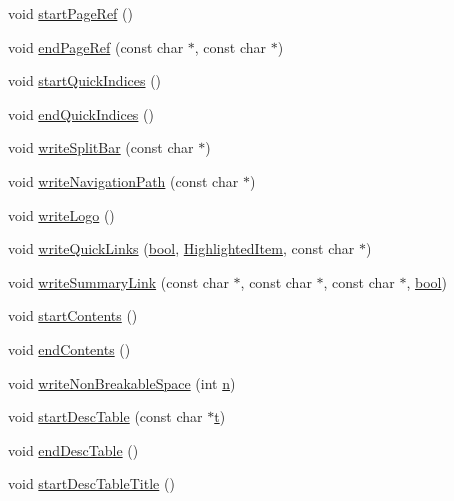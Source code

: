 \begin{DoxyCompactItemize}
\item 
void \hyperlink{class_man_generator_a15352d2d3122b7b9d24e9ea564026d9f}{start\+Page\+Ref} ()
\item 
void \hyperlink{class_man_generator_aedfd0c9012aa4bab7db46b5388552342}{end\+Page\+Ref} (const char $\ast$, const char $\ast$)
\item 
void \hyperlink{class_man_generator_a955d39d6b1272951e9c3696e55a7e97f}{start\+Quick\+Indices} ()
\item 
void \hyperlink{class_man_generator_a61560f36bab8608c98e9cf89fd5371bb}{end\+Quick\+Indices} ()
\item 
void \hyperlink{class_man_generator_a07aea6047475012679e979aca5d23038}{write\+Split\+Bar} (const char $\ast$)
\item 
void \hyperlink{class_man_generator_a51eac301eeb71972b89a4ac6be9fd6b5}{write\+Navigation\+Path} (const char $\ast$)
\item 
void \hyperlink{class_man_generator_abc49b9aa742057e1cbbea917451de6d7}{write\+Logo} ()
\item 
void \hyperlink{class_man_generator_aa821cd7a40d325d026c59dbd78221b98}{write\+Quick\+Links} (\hyperlink{qglobal_8h_a1062901a7428fdd9c7f180f5e01ea056}{bool}, \hyperlink{index_8h_a6643b7765422a7eb577f0b2ed8fb2e09}{Highlighted\+Item}, const char $\ast$)
\item 
void \hyperlink{class_man_generator_a984f33b43c990060e1472c97ed167304}{write\+Summary\+Link} (const char $\ast$, const char $\ast$, const char $\ast$, \hyperlink{qglobal_8h_a1062901a7428fdd9c7f180f5e01ea056}{bool})
\item 
void \hyperlink{class_man_generator_a3e53f87fe3a92cd4116370bb3207f2aa}{start\+Contents} ()
\item 
void \hyperlink{class_man_generator_ad218e5e4ee607d35a82476f6866d3dc0}{end\+Contents} ()
\item 
void \hyperlink{class_man_generator_ab73e17675d0c5ce30b48c9815c60ba74}{write\+Non\+Breakable\+Space} (int \hyperlink{060__command__switch_8tcl_acdde3cd86eb2421ce8dbb2e85227d368}{n})
\item 
void \hyperlink{class_man_generator_a7af24abd8f1dc66da50b6e515e12ed68}{start\+Desc\+Table} (const char $\ast$\hyperlink{class_output_generator_a55a40a8215efe6adc4d0a587ad9a46bc}{t})
\item 
void \hyperlink{class_man_generator_a0d3eea58e70d7213f199e3ed11d490dc}{end\+Desc\+Table} ()
\item 
void \hyperlink{class_man_generator_a43e02986b96420b036ba2204db980994}{start\+Desc\+Table\+Title} ()

\end{DoxyCompactItemize}

